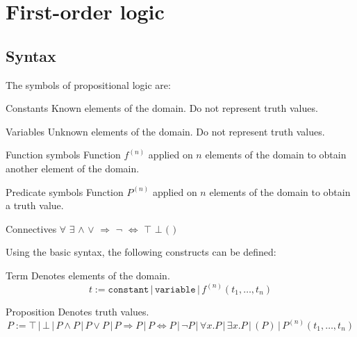 \chapter{First-order logic}


\section{Syntax}
The symbols of propositional logic are:
\begin{descriptionlist}
    \item[Constants]
        Known elements of the domain. Do not represent truth values.
        
    \item[Variables]
        Unknown elements of the domain. Do not represent truth values.
    
    \item[Function symbols] 
        Function $f^{(n)}$ applied on $n$ elements of the domain to obtain another element of the domain.

    \item[Predicate symbols]
        Function $P^{(n)}$ applied on $n$ elements of the domain to obtain a truth value.

    \item[Connectives] $\forall$ $\exists$ $\land$ $\vee$ $\Rightarrow$ $\lnot$ $\Leftrightarrow$ $\top$ $\bot$ $($ $)$
\end{descriptionlist}

Using the basic syntax, the following constructs can be defined:
\begin{descriptionlist}
    \item[Term] Denotes elements of the domain.
        \[ t := \texttt{constant} \,|\, \texttt{variable} \,|\, f^{(n)}(t_1, \dots, t_n) \]

    \item[Proposition] Denotes truth values.
        \[
            P := \top \,|\, \bot \,|\, P \land P \,|\, P \vee P \,|\,  P \Rightarrow P \,|\, P \Leftrightarrow P \,|\, 
                \lnot P \,|\, \forall x. P \,|\, \exists x. P \,|\, (P) \,|\, P^{(n)}(t_1, \dots, t_n) 
        \]
\end{descriptionlist}


